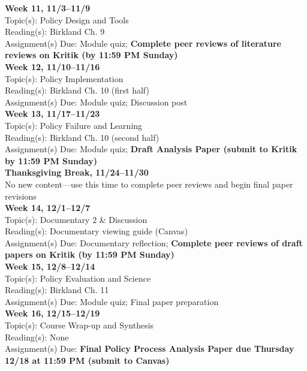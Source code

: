 \documentclass[12pt]{article}     %
\begin{document}
\noindent \textbf{Week 11, 11/3--11/9}\\
Topic(s): Policy Design and Tools\\
Reading(s): Birkland Ch. 9\\
Assignment(s) Due: Module quiz; \textbf{Complete peer reviews of literature reviews on Kritik (by 11:59 PM Sunday)}\\

\noindent \textbf{Week 12, 11/10--11/16}\\
Topic(s): Policy Implementation\\
Reading(s): Birkland Ch. 10 (first half)\\
Assignment(s) Due: Module quiz; Discussion post\\

\noindent \textbf{Week 13, 11/17--11/23}\\
Topic(s): Policy Failure and Learning\\
Reading(s): Birkland Ch. 10 (second half)\\
Assignment(s) Due: Module quiz; \textbf{Draft Analysis Paper (submit to Kritik by 11:59 PM Sunday)}\\

\noindent \textbf{Thanksgiving Break, 11/24--11/30}\\
No new content---use this time to complete peer reviews and begin final paper revisions\\

\noindent \textbf{Week 14, 12/1--12/7}\\
Topic(s): Documentary 2 \& Discussion\\
Reading(s): Documentary viewing guide (Canvas)\\
Assignment(s) Due: Documentary reflection; \textbf{Complete peer reviews of draft papers on Kritik (by 11:59 PM Sunday)}\\

\noindent \textbf{Week 15, 12/8--12/14}\\
Topic(s): Policy Evaluation and Science\\
Reading(s): Birkland Ch. 11\\
Assignment(s) Due: Module quiz; Final paper preparation\\

\noindent \textbf{Week 16, 12/15--12/19}\\
Topic(s): Course Wrap-up and Synthesis\\
Reading(s): None\\
Assignment(s) Due: \textbf{Final Policy Process Analysis Paper due Thursday 12/18 at 11:59 PM (submit to Canvas)}\\
\end{document}
